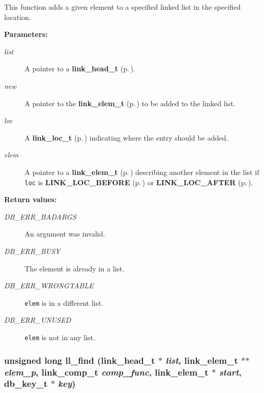  This function adds a given element to a specified linked list in the specified location.\begin{Desc}
\item[{\bf Parameters: }]\par
\begin{description}
\item[
{\em list}]A pointer to a {\bf link\_\-head\_\-t} {\rm (p.\,\pageref{group__dbprim__link_a0})}. \item[
{\em new}]A pointer to the {\bf link\_\-elem\_\-t} {\rm (p.\,\pageref{group__dbprim__link_a1})} to be added to the linked list. \item[
{\em loc}]A {\bf link\_\-loc\_\-t} {\rm (p.\,\pageref{group__dbprim__link_a4})} indicating where the entry should be added. \item[
{\em elem}]A pointer to a {\bf link\_\-elem\_\-t} {\rm (p.\,\pageref{group__dbprim__link_a1})} describing another element in the list if {\tt loc} is {\bf LINK\_\-LOC\_\-BEFORE} {\rm (p.\,\pageref{group__dbprim__link_a26a100})} or {\bf LINK\_\-LOC\_\-AFTER} {\rm (p.\,\pageref{group__dbprim__link_a26a101})}.\end{description}
\end{Desc}
\begin{Desc}
\item[{\bf Return values: }]\par
\begin{description}
\item[
{\em DB\_\-ERR\_\-BADARGS}]An argument was invalid. \item[
{\em DB\_\-ERR\_\-BUSY}]The element is already in a list. \item[
{\em DB\_\-ERR\_\-WRONGTABLE}]{\tt elem} is in a different list. \item[
{\em DB\_\-ERR\_\-UNUSED}]{\tt elem} is not in any list. \end{description}
\end{Desc}
\subsubsection{\setlength{\rightskip}{0pt plus 5cm}unsigned long ll\_\-find ({\bf link\_\-head\_\-t} $\ast$ {\em list}, {\bf link\_\-elem\_\-t} $\ast$$\ast$ {\em elem\_\-p}, {\bf link\_\-comp\_\-t} {\em comp\_\-func}, {\bf link\_\-elem\_\-t} $\ast$ {\em start}, {\bf db\_\-key\_\-t} $\ast$ {\em key})}\label{group__dbprim__link_a9}




